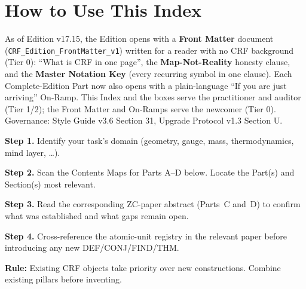 \documentclass[11pt, a4paper]{article}
\begin{document}
\tableofcontents
\newpage

\section*{How to Use This Index}

\begin{volumebox}[title={New reader? Start with the Front Matter (v3.6 Communication Layer)}]
\sloppy
As of Edition v17.15, the Edition opens with a \textbf{Front Matter}
document (\texttt{CRF\_Edition\_FrontMatter\_v1}) written for a reader with
no CRF background (Tier 0): ``What is CRF in one page'', the
\textbf{Map-Not-Reality} honesty clause, and the \textbf{Master Notation
Key} (every recurring symbol in one clause). Each Complete-Edition Part now
also opens with a plain-language ``If you are just arriving'' On-Ramp.
This Index and the boxes serve the practitioner and auditor (Tier 1/2);
the Front Matter and On-Ramps serve the newcomer (Tier 0).
Governance: Style Guide v3.6 Section 31, Upgrade Protocol v1.3 Section U.
\end{volumebox}

\begin{contentsbox}[title={Pre-Work Audit Protocol --- Quick Reference}]
\textbf{Step 1.} Identify your task's domain (geometry, gauge, mass,
thermodynamics, mind layer, \ldots).

\textbf{Step 2.} Scan the Contents Maps for Parts A--D below.
Locate the Part(s) and Section(s) most relevant.

\textbf{Step 3.} Read the corresponding ZC-paper abstract (Parts~C
and~D) to confirm what was established and what gaps remain open.

\textbf{Step 4.} Cross-reference the atomic-unit registry in the
relevant paper before introducing any new DEF/CONJ/FIND/THM.

\textbf{Rule:} Existing CRF objects take priority over new
constructions. Combine existing pillars before inventing.
\end{contentsbox}
\end{document}
